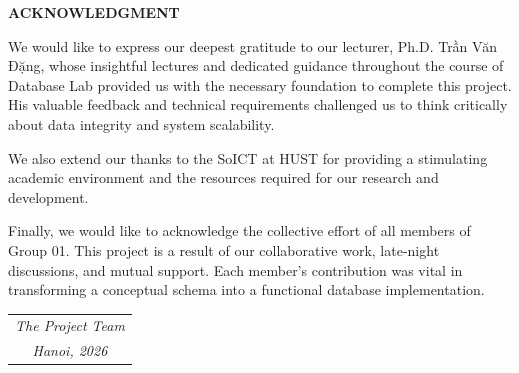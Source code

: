 \documentclass[../report_main.tex]{subfiles}
\begin{document}
\begin{center}
    \Large{\textbf{ACKNOWLEDGMENT}}\\
\end{center}
\vspace{1cm}

We would like to express our deepest gratitude to our lecturer, Ph.D. Trần Văn Đặng, whose insightful lectures and dedicated guidance throughout the course of Database Lab provided us with the necessary foundation to complete this project. His valuable feedback and technical requirements challenged us to think critically about data integrity and system scalability.

We also extend our thanks to the \gls{SoICT} at \gls{HUST} for providing a stimulating academic environment and the resources required for our research and development.

Finally, we would like to acknowledge the collective effort of all members of Group 01. This project is a result of our collaborative work, late-night discussions, and mutual support. Each member's contribution was vital in transforming a conceptual schema into a functional database implementation.

\vspace{1cm}
\begin{flushright}
\begin{tabular}{@{}c@{}}
    \textit{The Project Team} \\
    \textit{Hanoi, 2026}
\end{tabular}
\end{flushright}
\end{document}
